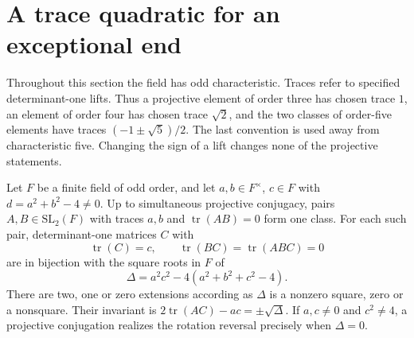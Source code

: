 \section{A trace quadratic for an exceptional end}
Throughout this section the field has odd characteristic. Traces refer to
specified determinant-one lifts. Thus a projective element of order three
has chosen trace $1$, an element of order four has chosen trace
$\sqrt2$, and the two classes of order-five elements have traces
$(-1\pm\sqrt5)/2$. The last convention is used away from characteristic
five. Changing the sign of a lift changes none of the projective statements.

\begin{theorem}\label{E.TraceExtension}
Let $F$ be a finite field of odd order, and let $a,b\in F^\times$, $c\in F$ with
$d=a^2+b^2-4\ne0$. Up to simultaneous projective conjugacy, pairs
$A,B\in\mathrm{SL}_2(F)$ with traces $a,b$ and $\operatorname{tr}(AB)=0$
form one class. For each such pair, determinant-one matrices $C$ with
\[
 \operatorname{tr}(C)=c,\qquad
 \operatorname{tr}(BC)=\operatorname{tr}(ABC)=0
\]
are in bijection with the square roots in $F$ of
\[
 \Delta=a^2c^2-4(a^2+b^2+c^2-4).
\]
There are two, one or zero extensions according as $\Delta$ is a nonzero
square, zero or a nonsquare. Their invariant is
$2\operatorname{tr}(AC)-ac=\pm\sqrt\Delta$.
If $a,c\ne0$ and $c^2\ne4$, a projective conjugation realizes the
rotation reversal precisely when $\Delta=0$.
\end{theorem}

